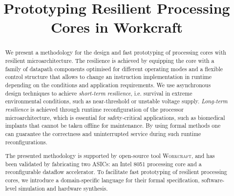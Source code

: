 \documentclass[conference]{IEEEtran}
\begin{document}
\title{Prototyping Resilient Processing Cores in Workcraft}

\vspace{-1mm}
\author{
\vspace{-6mm}
}

\maketitle

\begin{abstract}
We present a methodology for the design and fast prototyping of
processing cores with resilient microarchitecture. The resilience is
achieved by equipping the core with a family of datapath components
optimised for different operating modes and a flexible control
structure that allows to change an instruction implementation in
runtime depending on the conditions and application
requirements. We use asynchronous design techniques to achieve
\emph{short-term resilience}, i.e. survival in extreme environmental
conditions, such as near-threshold or unstable voltage supply.
\emph{Long-term resilience} is achieved through
runtime reconfiguration of the processor microarchitecture, which
is essential for safety-critical applications, such as biomedical
implants that cannot be taken offline for maintenance. By using
formal methods one can guarantee the correctness and uninterrupted
service during such runtime reconfigurations.

The presented methodology is supported by open-source tool
\textsc{Workcraft}, and has been validated by fabricating
two ASICs: an Intel 8051 processing core and a
reconfigurable dataflow accelerator.
To facilitate fast prototyping of resilient processing cores, we
introduce a domain-specific language for their formal specification,
software-level simulation and hardware synthesis.
\end{abstract}


\IEEEpeerreviewmaketitle
\end{document}
